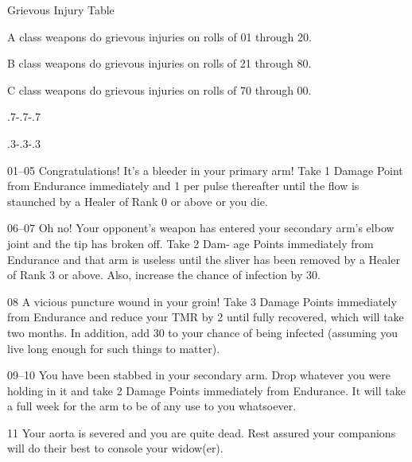 \begin{Chapter}{Grievous Injury Table}

\begin{Enumerate}
\item A class weapons do grievous injuries on rolls of 01 through 20.  
\item B class weapons do grievous injuries on rolls of 21 through 80.  
\item C class weapons do grievous injuries on rolls of 70 through 00.
\end{Enumerate}


\makeatletter
\patchcmd{\@item}
  {\addvspace\itemsep}
  {\par\kern\dimexpr.7\itemsep-.7\parskip-.7\baselineskip\relax%
   \hrulefill%
   \par\kern\dimexpr.3\itemsep-.3\parskip-.3\baselineskip\relax}
  {}{}%
\makeatother
  
\begin{Description}
\item[01–05] Congratulations! It’s a bleeder in your primary arm! Take
  1 Damage Point from Endurance immediately and 1 per pulse thereafter
  until the flow is staunched by a Healer of Rank 0 or above or you
  die.

\item[06–07] Oh no! Your opponent’s weapon has entered your secondary
  arm’s elbow joint and the tip has broken off. Take 2 Dam- age Points
  immediately from Endurance and that arm is useless until the sliver
  has been removed by a Healer of Rank 3 or above. Also, increase the
  chance of infection by 30.

\item[08] A vicious puncture wound in your groin!  Take 3 Damage
  Points immediately from Endurance and reduce your TMR by 2 until
  fully recovered, which will take two months. In addition, add 30 to
  your chance of being infected (assuming you live long enough for
  such things to matter).

\item[09–10] You have been stabbed in your secondary arm. Drop
  whatever you were holding in it and take 2 Damage Points immediately
  from Endurance. It will take a full week for the arm to be of any
  use to you whatsoever.

\item[11] Your aorta is severed and you are quite dead. Rest assured
  your companions will do their best to console your widow(er).


\end{Description}
\end{Chapter}
